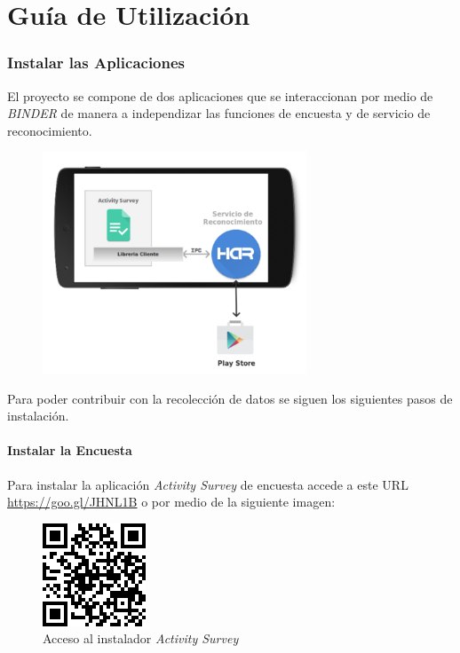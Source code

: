 \begin{table}[!h]
\begin{tabular}{lll}
\\
\end{tabular}
\end{table}

\section{Guía de Utilización}
\label{first:har-first}\label{first::doc}\label{first:primeros-pasos}

\subsubsection{Instalar las Aplicaciones}
\label{first:instalar-las-aplicaciones}
El proyecto se compone de dos aplicaciones \emph{} que se interaccionan por medio de  \emph{BINDER} de manera a
independizar las funciones de encuesta y de servicio de reconocimiento.

\begin{figure}[!h]
\centering
\includegraphics[width=0.7\textwidth]{anexos/graphics/archi_ipc.png}
\end{figure}

Para poder contribuir con la recolección de datos se siguen los siguientes pasos de instalación.

\paragraph{Instalar la Encuesta}
\label{first:instalar-la-encuesta}\label{first:har-survey}
Para instalar la aplicación \emph{Activity Survey} de encuesta accede a este URL \url{https://goo.gl/JHNL1B} o por medio de la siguiente 
imagen:
\begin{figure}[!h]
   \centering
   \includegraphics{anexos/graphics/qr_url.jpg}
\caption{Acceso al instalador \emph{Activity Survey}}\label{first:id1}\end{figure}

